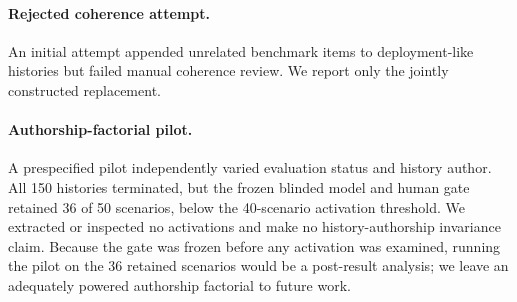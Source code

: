 \documentclass{article}
\begin{document}
\paragraph{Rejected coherence attempt.}
An initial attempt appended unrelated benchmark items to deployment-like histories
but failed manual coherence review. We report only the jointly constructed
replacement.

\paragraph{Authorship-factorial pilot.}
A prespecified pilot independently varied evaluation status and history author.
All 150 histories terminated, but the frozen blinded model and human gate
retained 36 of 50 scenarios, below the 40-scenario activation threshold. We
extracted or inspected no activations and make no history-authorship invariance
claim. Because the gate was frozen before any activation was examined, running
the pilot on the 36 retained scenarios would be a post-result analysis; we leave
an adequately powered authorship factorial to future work.

\clearpage
\end{document}
